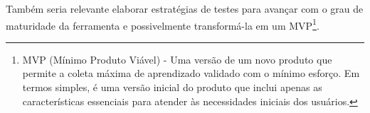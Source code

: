 Também seria relevante elaborar estratégias de testes para avançar com o grau de maturidade da ferramenta e possivelmente transformá-la em um MVP\footnote{MVP (Mínimo Produto Viável) - Uma versão de um novo produto que permite a coleta máxima de aprendizado validado com o mínimo esforço. Em termos simples, é uma versão inicial do produto que inclui apenas as características essenciais para atender às necessidades iniciais dos usuários.}.






